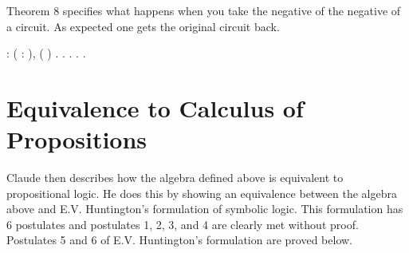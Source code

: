 \documentclass[11pt,twocolumn]{article}
\begin{document}
Theorem 8 specifies what happens when you take the negative of the
negative of a circuit.  As expected one gets the original circuit
back.


\begin{coqdoccode}
\coqdocemptyline
\coqdocnoindent
{}  : \coqdockw{\ensuremath{\forall}} ( : ),\coqdoceol
\coqdocindent{2.00em}
 ( )  .\coqdoceol
\coqdocnoindent
{}.\coqdoceol
\coqdocindent{1.00em}
 .\coqdoceol
\coqdocindent{1.00em}
 .\coqdoceol
\coqdocnoindent
{}.\coqdoceol
\coqdocemptyline
\end{coqdoccode}
\section{Equivalence to Calculus of Propositions}




Claude then describes how the algebra defined above is equivalent to
propositional logic.  He does this by showing an equivalence
between the algebra above and E.V. Huntington's formulation of
symbolic logic.  This formulation has 6 postulates and postulates 1,
2, 3, and 4 are clearly met without proof.  Postulates 5 and 6 of
E.V. Huntington's formulation are proved below.
\end{document}
